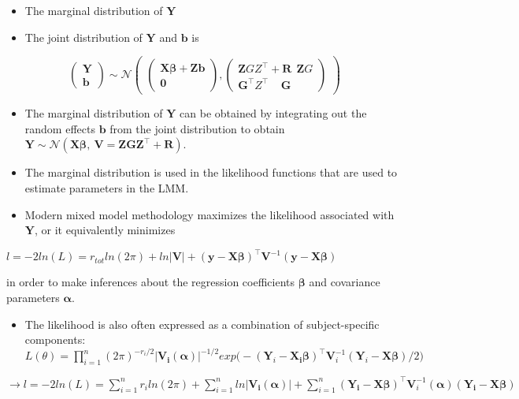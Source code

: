 \documentclass[
  9pt,
  ignorenonframetext,
]{beamer}
\providecommand{\tightlist}{%
  \setlength{\itemsep}{0pt}\setlength{\parskip}{0pt}}
\begin{document}
\begin{frame}{}
\protect\hypertarget{section-7}{}
\begin{itemize}
\item
  The marginal distribution of \(\pmb Y\)
\item
  The joint distribution of \(\pmb Y\) and \(\pmb b\) is
\end{itemize}

\[
\begin{pmatrix}
\pmb Y\\ \pmb b
\end{pmatrix} \sim \mathcal N
\begin{pmatrix}
\begin{pmatrix}
\pmb {X\beta} +\pmb {Zb}\\ \pmb 0
\end{pmatrix},
\begin{pmatrix}
\pmb ZGZ^{\top} +\pmb R\ \ \pmb ZG\\ \pmb G^{\top}Z^{\top}\ \ \ \ \  \pmb G
\end{pmatrix}
\end{pmatrix}
\]

\begin{itemize}
\item
  The marginal distribution of \(\pmb Y\) can be obtained by integrating
  out the random effects \(\pmb b\) from the joint distribution to
  obtain
  \(\pmb Y \sim \mathcal N (\pmb {X\beta},\ \pmb V = \pmb {ZGZ}^{\top} + \pmb R)\).
\item
  The marginal distribution is used in the likelihood functions that are
  used to estimate parameters in the LMM.
\end{itemize}
\end{frame}

\begin{frame}{}
\protect\hypertarget{section-8}{}
\begin{itemize}
\tightlist
\item
  Modern mixed model methodology maximizes the likelihood associated
  with \(\pmb Y\), or it equivalently minimizes
\end{itemize}

\(l = -2ln(L) = r_{tot}ln(2\pi) + ln |\pmb V| + \pmb {(y-X\beta)}^{\top}\pmb V^{-1} \pmb {(y-X\beta)}\)

in order to make inferences about the regression coefficients
\(\pmb \beta\) and covariance parameters \(\pmb \alpha\).

\begin{itemize}
\tightlist
\item
  The likelihood is also often expressed as a combination of
  subject-specific components:
  \(L(\theta)=\prod_{i=1}^n{(2\pi)^{-r_i/2} |\pmb {V_i (\alpha)} |^{-1/2} exp \big(-(\pmb Y_i - \pmb {X_i \beta} )^{\top} \pmb V_i^{-1} (\pmb Y_i - \pmb {X\beta})/2 \big)}\)
\end{itemize}

\(\rightarrow l =-2ln(L)=\sum_{i=1}^n r_i ln(2\pi) + \sum_{i=1}^n ln|\pmb {V_i (\alpha)}| + \sum_{i=1}^n (\pmb {Y_i-X\beta})^{\top} \pmb V_i^{-1} (\pmb \alpha)(\pmb {Y_i-X\beta})\)
\end{frame}
\end{document}
